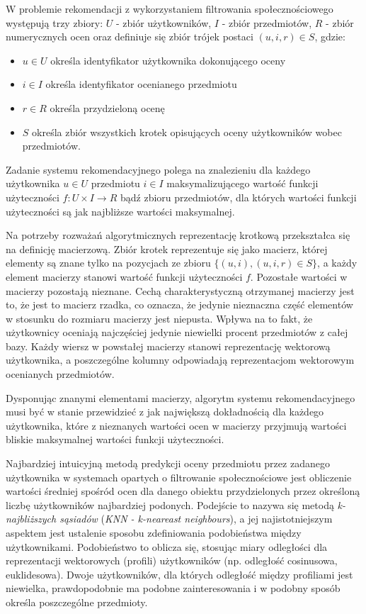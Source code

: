 \documentclass{pracamgr}
\begin{document}
W problemie rekomendacji z wykorzystaniem filtrowania społecznościowego występują trzy zbiory: $U$ - zbiór użytkowników, $I$ - zbiór przedmiotów, $R$ - zbiór numerycznych ocen oraz definiuje się zbiór trójek postaci $(u, i, r) \in S $, gdzie:
\begin{itemize} %
    \item $u \in U$ określa identyfikator użytkownika dokonującego oceny
    \item $i \in I$ określa identyfikator ocenianego przedmiotu
    \item $r \in R$ określa przydzieloną ocenę
    \item $S$ określa zbiór wszystkich krotek opisujących oceny użytkowników wobec przedmiotów.
\end{itemize}

Zadanie systemu rekomendacyjnego polega na znalezieniu dla każdego użytkownika $u \in U$ przedmiotu $i \in I$ maksymalizującego wartość funkcji użyteczności $f : U \times I \rightarrow R$ bądź zbioru przedmiotów, dla których wartości funkcji użyteczności są jak najbliższe wartości maksymalnej.

Na potrzeby rozważań algorytmicznych reprezentację krotkową przekształca się na definicję macierzową. Zbiór krotek reprezentuje się jako macierz, której elementy są znane tylko na pozycjach ze zbioru $\{(u, i) , (u, i, r) \in S\}$, a każdy element macierzy stanowi wartość funkcji użyteczności $f$. Pozostałe wartości w macierzy pozostają nieznane. Cechą charakterystyczną otrzymanej macierzy jest to, że jest to macierz rzadka, co oznacza, że jedynie nieznaczna część elementów w stosunku do rozmiaru macierzy jest niepusta. Wpływa na to fakt, że użytkownicy oceniają najczęściej jedynie niewielki procent przedmiotów z całej bazy. Każdy wiersz w powstałej macierzy stanowi reprezentację wektorową użytkownika, a poszczególne kolumny odpowiadają reprezentacjom wektorowym ocenianych przedmiotów.

Dysponując znanymi elementami macierzy, algorytm systemu rekomendacyjnego musi być w stanie przewidzieć z jak największą dokładnością dla każdego użytkownika, które z nieznanych wartości ocen w macierzy przyjmują wartości bliskie maksymalnej wartości funkcji użyteczności. 

Najbardziej intuicyjną metodą predykcji oceny przedmiotu przez zadanego użytkownika w systemach opartych o filtrowanie społecznościowe jest obliczenie wartości średniej spośród ocen dla danego obiektu przydzielonych przez określoną liczbę użytkowników najbardziej podonych. Podejście to nazywa się metodą \textit{k-najbliższych sąsiadów} (\textit{KNN - k-neareast neighbours}), a jej najistotniejszym aspektem jest ustalenie sposobu zdefiniowania podobieństwa między użytkownikami. Podobieństwo to oblicza się, stosując miary odległości dla reprezentacji wektorowych (profili) użytkowników (np. odległość cosinusowa, euklidesowa). Dwoje użytkowników, dla których odległość między profiliami jest niewielka, prawdopodobnie ma podobne zainteresowania i w podobny sposób określa poszczególne przedmioty.
\end{document}
